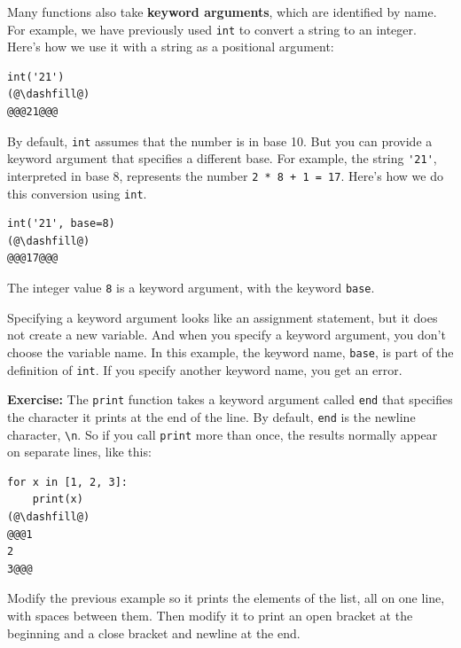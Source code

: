 Many functions also take \textbf{keyword arguments}, which are
identified by name. For example, we have previously used
\passthrough{\lstinline!int!} to convert a string to an integer. Here's
how we use it with a string as a positional argument:

\begin{lstlisting}[]
int('21')
(@\dashfill@)
@@@21@@@
\end{lstlisting}

By default, \passthrough{\lstinline!int!} assumes that the number is in
base 10. But you can provide a keyword argument that specifies a
different base. For example, the string \passthrough{\lstinline!'21'!},
interpreted in base 8, represents the number
\passthrough{\lstinline!2 * 8 + 1 = 17!}. Here's how we do this
conversion using \passthrough{\lstinline!int!}.

\begin{lstlisting}[]
int('21', base=8)
(@\dashfill@)
@@@17@@@
\end{lstlisting}

The integer value \passthrough{\lstinline!8!} is a keyword argument,
with the keyword \passthrough{\lstinline!base!}.

Specifying a keyword argument looks like an assignment statement, but it
does not create a new variable. And when you specify a keyword argument,
you don't choose the variable name. In this example, the keyword name,
\passthrough{\lstinline!base!}, is part of the definition of
\passthrough{\lstinline!int!}. If you specify another keyword name, you
get an error.

\textbf{Exercise:} The \passthrough{\lstinline!print!} function takes a
keyword argument called \passthrough{\lstinline!end!} that specifies the
character it prints at the end of the line. By default,
\passthrough{\lstinline!end!} is the newline character,
\passthrough{\lstinline!\\n!}. So if you call
\passthrough{\lstinline!print!} more than once, the results normally
appear on separate lines, like this:

\begin{lstlisting}[]
for x in [1, 2, 3]:
    print(x)
(@\dashfill@)
@@@1
2
3@@@
\end{lstlisting}

Modify the previous example so it prints the elements of the list, all
on one line, with spaces between them. Then modify it to print an open
bracket at the beginning and a close bracket and newline at the end.

